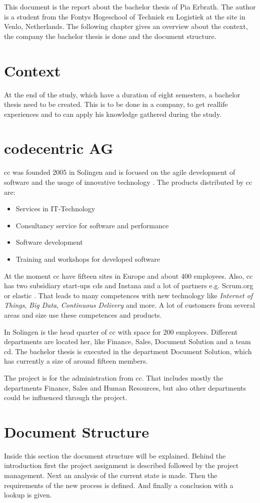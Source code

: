 This document is the report about the bachelor thesis of Pia Erbrath. The author is a student from the Fontys Hogeschool of Techniek en Logistiek at the site in Venlo, Netherlands. The following chapter gives an overview about the context, the company the bachelor thesis is done and the document structure.

\section{Context}
At the end of the study, which have a duration of eight semesters, a bachelor thesis need to be created. This is to be done in a company, to get \flqq real\frqq life experiences and to can apply his knowledge gathered during the study.  

\section{codecentric AG}
\Gls{cc} was founded 2005 in Solingen and is focused on the agile development of software and the usage of innovative technology \parencite{codecentric2018unternehmen}. The products distributed by \gls{cc} are: 
\begin{itemize}
	\item Services in \gls{IT}-Technology
	\item Consultancy service for software and performance
	\item Software development
	\item Training and workshops for developed software
\end{itemize}
At the moment \gls{cc} have fifteen sites in Europe and about 400 employees. Also, \gls{cc} has two subsidiary start-ups \glspl{cd} and Instana \parencite{codecentric2018startups} and a lot of partners e.g. Scrum.org or elastic \parencite{codecentric2018partner}.
That leads to many competences with new technology like \textit{Internet of Things}, \textit{Big Data}, \textit{Continuous Delivery} and more.
A lot of customers from several areas and size use these competences and products.

In Solingen is the head quarter of \gls{cc} with space for 200 employees. Different departments are located her, like Finance, Sales, Document Solution and a team \gls{cd}.   
The bachelor thesis is executed in the department Document Solution, which has currently a size of around fifteen members.

The project is for the administration from \gls{cc}. That includes mostly the departments Finance, Sales and Human Resources, but also other departments could be influenced through the project.

\section{Document Structure}
Inside this section the document structure will be explained. Behind the introduction first the project assignment is described followed by the project management. Next an analysis of the current state is made. Then the requirements of the new process is defined. And finally a conclusion with a lookup is given.